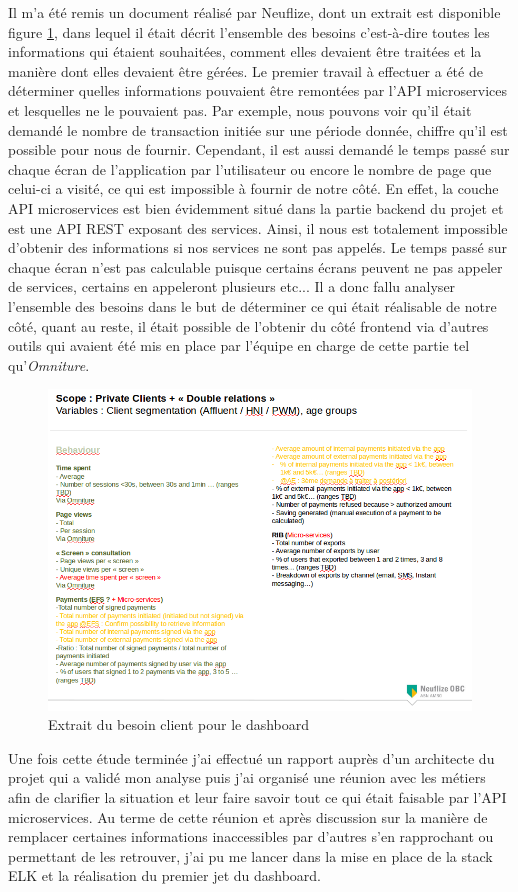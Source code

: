 	Il m'a été remis un document réalisé par Neuflize, dont un extrait est disponible figure \ref{elkBesoin}, dans lequel il était décrit l'ensemble des besoins c'est-à-dire toutes les informations qui étaient souhaitées, comment elles devaient être traitées et la manière dont elles devaient être gérées. Le premier travail à effectuer a été de déterminer quelles informations pouvaient être remontées par l'API microservices et lesquelles ne le pouvaient pas. Par exemple, nous pouvons voir qu'il était demandé le nombre de transaction initiée sur une période donnée, chiffre qu'il est possible pour nous de fournir. Cependant, il est aussi demandé le temps passé sur chaque écran de l'application par l'utilisateur ou encore le nombre de page que celui-ci a visité, ce qui est impossible à fournir de notre côté. En effet, la couche API microservices est bien évidemment situé dans la partie backend du projet et est une API REST exposant des services. Ainsi, il nous est totalement impossible d'obtenir des informations si nos services ne sont pas appelés. Le temps passé sur chaque écran n'est pas calculable puisque certains écrans peuvent ne pas appeler de services, certains en appeleront plusieurs etc... Il a donc fallu analyser l'ensemble des besoins dans le but de déterminer ce qui était réalisable de notre côté, quant au reste, il était possible de l'obtenir du côté frontend via d'autres outils qui avaient été mis en place par l'équipe en charge de cette partie tel qu'\textit{Omniture}.
	
\begin{figure}[h!]
	\includegraphics[scale=0.6]{images/travailNeuflizeOBC/dashboard/elkBesoin.png}
	\centering
	\caption{Extrait du besoin client pour le dashboard}
	\label{elkBesoin}
\end{figure}
	
	Une fois cette étude terminée j'ai effectué un rapport auprès d'un architecte du projet qui a validé mon analyse puis j'ai organisé une réunion avec les métiers afin de clarifier la situation et leur faire savoir tout ce qui était faisable par l'API microservices. Au terme de cette réunion et après discussion sur la manière de remplacer certaines informations inaccessibles par d'autres s'en rapprochant ou permettant de les retrouver, j'ai pu me lancer dans la mise en place de la stack ELK et la réalisation du premier jet du dashboard.